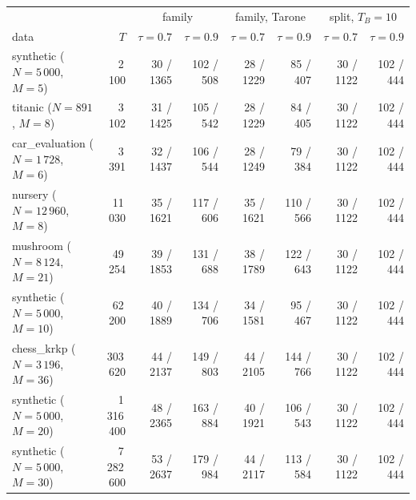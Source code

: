 \begin{tabular}{lrrrrrrr}
\toprule
& & \multicolumn{2}{c}{family} & \multicolumn{2}{c}{family, Tarone} & \multicolumn{2}{c}{split, $T_B=10$}\\
data & $T$ & $\tau=0.7$ & $\tau=0.9$ & $\tau=0.7$ & $\tau=0.9$ & $\tau=0.7$ & $\tau=0.9$\\
\midrule
synthetic ($N=5\,000$, $M=5$) & 2\,100 & 30 / 1365 & 102 / 508 & 28 / 1229 & 85 / 407 & 30 / 1122 & 102 / 444\\
titanic ($N=891$, $M=8$) & 3\,102 & 31 / 1425 & 105 / 542 & 28 / 1229 & 84 / 405 & 30 / 1122 & 102 / 444\\
car\_evaluation ($N=1\,728$, $M=6$) & 3\,391 & 32 / 1437 & 106 / 544 & 28 / 1249 & 79 / 384 & 30 / 1122 & 102 / 444\\
nursery ($N=12\,960$, $M=8$) & 11\,030 & 35 / 1621 & 117 / 606 & 35 / 1621 & 110 / 566 & 30 / 1122 & 102 / 444\\
mushroom ($N=8\,124$, $M=21$) & 49\,254 & 39 / 1853 & 131 / 688 & 38 / 1789 & 122 / 643 & 30 / 1122 & 102 / 444\\
synthetic ($N=5\,000$, $M=10$) & 62\,200 & 40 / 1889 & 134 / 706 & 34 / 1581 & 95 / 467 & 30 / 1122 & 102 / 444\\
chess\_krkp ($N=3\,196$, $M=36$) & 303\,620 & 44 / 2137 & 149 / 803 & 44 / 2105 & 144 / 766 & 30 / 1122 & 102 / 444\\
synthetic ($N=5\,000$, $M=20$) & 1\,316\,400 & 48 / 2365 & 163 / 884 & 40 / 1921 & 106 / 543 & 30 / 1122 & 102 / 444\\
synthetic ($N=5\,000$, $M=30$) & 7\,282\,600 & 53 / 2637 & 179 / 984 & 44 / 2117 & 113 / 584 & 30 / 1122 & 102 / 444\\
\bottomrule
\end{tabular}
